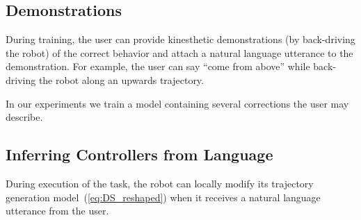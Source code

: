 \subsection{Demonstrations}

During training, the user can provide kinesthetic demonstrations (by back-driving the robot) of the correct behavior and attach a natural language utterance to the demonstration.
For example, the user can say ``come from above'' while back-driving the robot along an upwards trajectory.


In our experiments we train a model containing several corrections the user may describe.


\subsection{Inferring Controllers from Language}

During execution of the task, the robot can locally modify its trajectory generation model~(\cref{eq:DS_reshaped}) when it receives a natural language utterance from the user.
